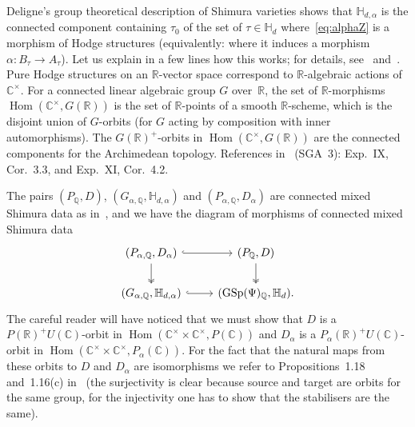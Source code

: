 \documentclass[JEP,XML,SOM,Unicode,NoFloatCountersInSection]{cedram}
\theoremstyle{plain}
\theoremstyle{definition}
\numberwithin{equation}{subsection}
\renewcommand{\C}{\mathbb C}
\newcommand{\R}{\mathbb R}
\newcommand{\Q}{\mathbb Q}
\renewcommand{\H}{\mathbb H}
\DeclareMathOperator{\Hom}{Hom}
\DeclareMathOperator{\GSp}{GSp}
\begin{document}
Deligne's group theoretical description of Shimura varieties shows
that $\H_{d,\alpha}$ is the connected component containing $\tau_0$ of
the set of $\tau\in\H_d$ where~\eqref{eq:alphaZ} is a morphism of
Hodge structures (equivalently: where it induces a morphism
$\alpha\colon B_\tau\to A_\tau$). Let us explain in a few lines how
this works; for details, see~\cite[\S 2.4]{Moonen-L1}
and~\cite[\S 1.1.12]{Deligne-VS}. Pure Hodge structures on an
$\R$-vector space correspond to $\R$-algebraic actions
of~$\C^\times$. For a connected linear algebraic group $G$ over~$\R$,
the set of $\R$-morphisms $\Hom(\C^\times,G(\R))$ is the set of
$\R$-points of a smooth $\R$-scheme, which is the disjoint union of
$G$\nobreakdash-orbits (for $G$ acting by composition with inner automorphisms).
The $G(\R)^+$-orbits in $\Hom(\C^\times,G(\R))$ are the connected
components for the Archimedean topology. References in~\cite{SGA3.II}
(SGA~3): Exp.~IX, Cor.~3.3, and Exp.~XI, Cor.~4.2.

The pairs $(P_\Q,D)$, $(G_{\alpha,\Q},\H_{d,\alpha})$ and
$(P_{\alpha,\Q},D_\alpha)$ are connected mixed Shimura data as
in~\cite[Def.\,2.1]{Pink1}, and we have the diagram of morphisms of
connected mixed Shimura data
\begin{equation}
\begin{tikzcd}
(P_{\alpha,\Q},D_\alpha) \ar[r, hook] \ar[d, two heads]& (P_\Q,D) \ar[d, two heads]\\
(G_{\alpha,\Q},\H_{d,\alpha}) \ar[r,hook] & (\GSp(\Psi)_\Q,\H_d).
\end{tikzcd}
\end{equation}
The careful reader will have noticed that we must show that $D$ is a
$P(\R)^+U(\C)$-orbit in $\Hom(\C^\times\times\C^\times,P(\C))$ and
$D_\alpha$ is a $P_\alpha(\R)^+U(\C)$-orbit in
$\Hom(\C^\times\times\C^\times,P_\alpha(\C))$. For the fact that the
natural maps from these orbits to $D$ and $D_\alpha$ are isomorphisms
we refer to Propositions~1.18 and~1.16(c) in~\cite{Pink_thesis} (the
surjectivity is clear because source and target are orbits for the
same group, for the injectivity one has to show that the stabilisers
are the same).
\end{document}
